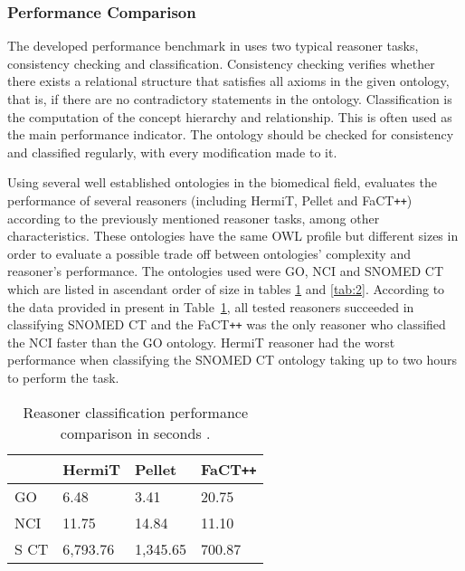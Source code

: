 \subsubsection{Performance Comparison}

The developed performance benchmark in \cite{Dentler2011} uses two typical reasoner tasks, consistency checking and classification. Consistency checking verifies whether there exists a relational structure that satisfies all axioms in the given ontology, that is, if there are no contradictory statements in the ontology. Classification is the computation of the concept hierarchy and relationship. This is often used as the main performance indicator. The ontology should be checked for consistency and classified regularly, with every modification made to it. 

Using several well established ontologies in the biomedical field, \cite{Dentler2011} evaluates the performance of several reasoners (including HermiT, Pellet and FaCT\texttt{++}) according to the previously mentioned reasoner tasks, among other characteristics. These ontologies have the same OWL profile but different sizes in order to evaluate a possible trade off between ontologies' complexity and reasoner's performance. The ontologies used were GO, NCI and SNOMED CT which are listed in ascendant order of size in tables \ref{tab:1} and \ref{tab:2}. According to the data provided in \cite{Dentler2011} present in Table~\ref{tab:1}, all tested reasoners succeeded in classifying SNOMED CT and the FaCT\texttt{++} was the only reasoner who classified the NCI faster than the GO ontology. HermiT reasoner had the worst performance when classifying the SNOMED CT ontology taking up to two hours to perform the task.



\begin{table}[]
\centering
\caption{Reasoner classification performance comparison in seconds \cite{Dentler2011}.}
\begin{tabular}{|l|l|l|l|}
\hline
      &  HermiT    &  Pellet     &  FaCT\texttt{++}    \\ \hline
GO    &    6.48    &  3.41       &  20.75     \\ \hline
NCI   &   11.75    &  14.84      &  11.10     \\ \hline
S CT  &  6,793.76  &  1,345.65   &  700.87    \\ \hline
\end{tabular}
\label{tab:1}
\end{table}

